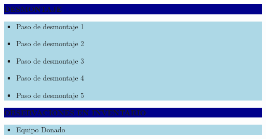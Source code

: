 \documentclass[11pt]{article}
\newcommand{\seccionbanda}[1]{%
  \vspace{0.6em}
  \noindent\colorbox{darkblue}{\parbox{\dimexpr\linewidth-2\fboxsep}{%
    \centering\color{white}\bfseries #1}}\par\vspace{0.6em}
}
\begin{document}
\seccionbanda{DESMONTAJE}
\noindent\colorbox{lightblue}{\parbox{\dimexpr\linewidth-2\fboxsep\relax}{%
\begin{itemize}[label=$\square$, itemsep=4pt]
\item Paso de desmontaje 1
\item Paso de desmontaje 2
\item Paso de desmontaje 3
\item Paso de desmontaje 4
\item Paso de desmontaje 5
\end{itemize}
}}\par
\seccionbanda{OBSERVACIONES EN INVENTARIO}
\noindent\colorbox{lightblue}{\parbox{\dimexpr\linewidth-2\fboxsep\relax}{\begin{itemize}[itemsep=4pt]
\item Equipo Donado
\end{itemize}}}\par
\end{document}

